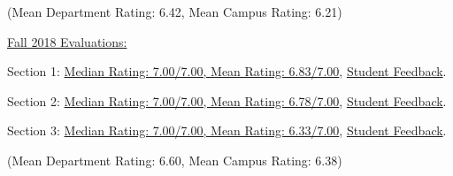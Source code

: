 \documentclass[letterpaper,11pt]{article}
\begin{document}
{\begin{description}
				\item (Mean Department Rating: 6.42, Mean Campus Rating: 6.21)
				\item \underline{Fall 2018 Evaluations:}
				\item Section 1: \href{https://nrjenkins.github.io/nrjenkins.github.io/files/docs/teaching_evals/POSC010_Fall20_Section24_Scores.pdf}{Median Rating: 7.00/7.00, Mean Rating: 6.83/7.00}, \href{https://nrjenkins.github.io/nrjenkins.github.io/files/docs/teaching_evals/POSC010_Fall20_Section24_Comments.pdf}{Student Feedback}.
				\item Section 2: \href{https://nrjenkins.github.io/nrjenkins.github.io/files/docs/teaching_evals/POSC010_Fall20_Section26_Scores.pdf}{Median Rating: 7.00/7.00, Mean Rating: 6.78/7.00}, \href{https://nrjenkins.github.io/nrjenkins.github.io/files/docs/teaching_evals/POSC010_Fall20_Section26_Comments.pdf}{Student Feedback}.
				\item Section 3: \href{https://nrjenkins.github.io/nrjenkins.github.io/files/docs/teaching_evals/POSC010_Fall20_Section32_Scores.pdf}{Median Rating: 7.00/7.00, Mean Rating: 6.33/7.00}, \href{https://nrjenkins.github.io/nrjenkins.github.io/files/docs/teaching_evals/POSC010_Fall20_Section32_Comments.pdf}{Student Feedback}.
				\item (Mean Department Rating: 6.60, Mean Campus Rating: 6.38)
			\end{description}}
\end{document}

